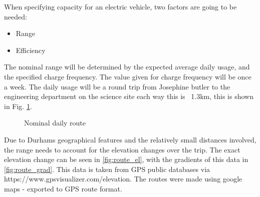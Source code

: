 \documentclass{article}
\begin{document}
When specifying capacity for an electric vehicle, two factors are going to be needed:
\begin{itemize}
    \item Range
    \item Efficiency
\end{itemize}
The nominal range will be determined by the expected average daily usage, and the specified charge frequency. 
The value given for charge frequency will be once a week.
The daily usage will be a round trip from Josephine butler to the engineering department on the science site each way this is ~1.3km, this is shown in Fig. \ref{fig:route}.
\begin{figure}[H]
    \centering
    \caption{Nominal daily route}
    \label{fig:route}
\end{figure}
Due to Durhams geographical features and the relatively small distances involved, the range needs to account for the elevation changes over the trip.
The exact elevation change can be seen in \ref{fig:route_el}, with the gradients of this data in \ref{fig:route_grad}.
This data is taken from GPS public databases via https://www.gpsvisualizer.com/elevation.
The routes were made using google maps - exported to GPS route format.
\end{document}
